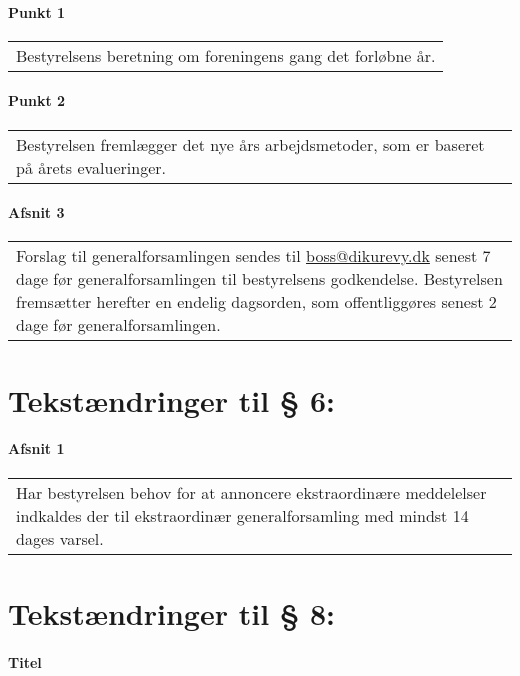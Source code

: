 \documentclass[a4paper,11pt]{report}
\newenvironment{quotationb}%
{\begin{tabular}{|p{10cm}}}%
{\\\end{tabular}}
\begin{document}
\begin{appendices}
\paragraph{Punkt 1}

\begin{quotationb}
Bestyrelsens beretning om foreningens gang det forløbne år.
\end{quotationb}

\paragraph{Punkt 2}

\begin{quotationb}
Bestyrelsen fremlægger det nye års arbejdsmetoder, som er baseret på årets
evalueringer.
\end{quotationb}

\paragraph{Afsnit 3}

\begin{quotationb}
Forslag til generalforsamlingen sendes til \url{boss@dikurevy.dk} senest 7 dage før
generalforsamlingen til bestyrelsens godkendelse.  Bestyrelsen fremsætter
herefter en endelig dagsorden, som offentliggøres senest 2 dage før
generalforsamlingen.
\end{quotationb}

\section*{Tekstændringer til § 6:}

\paragraph{Afsnit 1}

\begin{quotationb}
Har bestyrelsen behov for at annoncere ekstraordinære meddelelser indkaldes
der til ekstraordinær generalforsamling med mindst 14 dages varsel.
\end{quotationb}

\section*{Tekstændringer til § 8:}

\paragraph{Titel}


\end{appendices}
\end{document}
